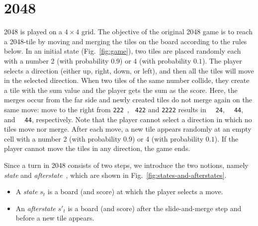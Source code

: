 \section{2048}

2048 is played on a $4 \times 4$ grid.
The objective of the original 2048 game is to reach a 2048-tile by moving and merging
the tiles on the board according to the rules below.
In an initial state (Fig.~\ref{fig:game}), two tiles are placed randomly each with a number 2 (with probability $0.9$) or 4 (with probability $0.1$).
The player selects a direction (either up, right, down, or left), and then all the tiles will move in the selected direction.
When two tiles of the same number collide, they create a tile with the sum value and the player gets the sum as the score.
Here, the merges occur from the far side and newly created tiles do not merge again on the same move: move to the right from \verb*|222 |, \verb*| 422| and \verb*|2222| results in
\verb*|  24|, \verb*|  44|, and \verb*|  44|, respectively.
Note that the player cannot select a direction in which no tiles move nor merge.
After each move, a new tile appears randomly at an empty cell with a number 2 (with probability $0.9$) or 4 (with probability $0.1$).
If the player cannot move the tiles in any direction, the game ends.

Since a turn in 2048 consists of two steps, we introduce the two notions, namely \emph{state} and \emph{afterstate}~\cite{SzJa14}, which are shown in Fig.~\ref{fig:states-and-afterstates}.
\begin{itemize}
 \item A \emph{state} $s_t$ is a board (and score) at which the player selects a move.
 \item An \emph{afterstate} $s'_t$ is a board (and score) after the slide-and-merge step and before a new tile appears.
\end{itemize}

